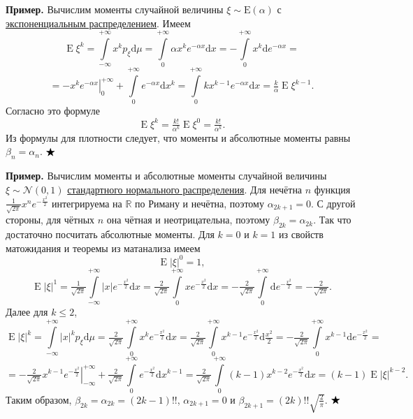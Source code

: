 \documentclass[12pt]{article}
\numberwithin{theorem}{section}
\theoremstyle{definition}
\newenvironment{example}{\indent \textbf{Пример.}}{$ \hfill \bigstar $}
\newcommand{\RR}{\mathbb{R}}
\newcommand{\expect}{\operatorname{E}}
\newcommand{\diff}{\mathrm{d}}
\begin{document}
	\begin{example}
		Вычислим моменты случайной величины $ \xi \sim \mathrm{E}(\alpha) $ 
		с \hyperlink{exponential-distribution}{экспоненциальным распределением}.
		Имеем
		$$ \expect\xi^k = \int\limits_{-\infty}^{+\infty} x^k p_\xi \diff\mu
		= \int\limits_{0}^{+\infty} \alpha x^k e^{-\alpha x} \diff x
		= -\int\limits_{0}^{+\infty} x^k \diff e^{-\alpha x} = $$ 
		$$ = \left.-x^ke^{-\alpha x}\right|_{0}^{+\infty} 
		+ \int\limits_{0}^{+\infty} e^{-\alpha x}\diff x^k
		= \int\limits_{0}^{+\infty} kx^{k - 1} e^{-\alpha x}\diff x
		= \tfrac{k}{\alpha}\expect\xi^{k - 1}. $$
		Согласно это формуле
		$$ \expect\xi^k = \tfrac{k!}{\alpha^k} \expect\xi^0 = \tfrac{k!}{\alpha^k}. $$
		Из формулы для плотности следует, что моменты и абсолютные моменты равны $ \beta_n = \alpha_n $.
	\end{example}
	
	\begin{example}
		Вычислим моменты и абсолютные моменты случайной величины $ \xi \sim \mathcal{N}(0, 1) $ 
		\hyperlink{standard-normal-distribution}{стандартного нормального распределения}.
		Для нечётна $ n $ функция $ \tfrac{1}{\sqrt{2\pi}} x^n e^{-\tfrac{x^2}{2}} $
		интегрируема на $ \RR $ по Риману и нечётна, поэтому
		$ \alpha_{2k + 1} = 0 $.
		С другой стороны, для чётных $ n $ она чётная и неотрицательна, поэтому $ \beta_{2k} = \alpha_{2k} $.
		Так что достаточно посчитать абсолютные моменты.
		Для $ k = 0 $ и $ k = 1 $ из свойств матожидания и теоремы из матанализа имеем
		$$ \expect|\xi|^0 = 1, $$ 
		$$ \expect|\xi|^1 = \tfrac{1}{\sqrt{2\pi}} \int\limits_{-\infty}^{+\infty} |x|e^{-\tfrac{x^2}{2}} \diff x 
		= \tfrac{2}{\sqrt{2\pi}} \int\limits_{0}^{+\infty} xe^{-\tfrac{x^2}{2}} \diff x
		= -\tfrac{2}{\sqrt{2\pi}} \int\limits_{0}^{+\infty} \diff e^{-\tfrac{x^2}{2}}
		= -\tfrac{2}{\sqrt{2\pi}}. $$
		Далее для $ k \leqslant 2 $,
		$$ \expect|\xi|^k = \int\limits_{-\infty}^{+\infty} |x|^k p_\xi \diff\mu
		= \tfrac{2}{\sqrt{2\pi}} \int\limits_{0}^{+\infty} x^k e^{-\tfrac{x^2}{2}} \diff x
		= \tfrac{2}{\sqrt{2\pi}} \int\limits_{0}^{+\infty} x^{k - 1} e^{-\tfrac{x^2}{2}} \diff \tfrac{x^2}{2}
		= - \tfrac{2}{\sqrt{2\pi}} \int\limits_{0}^{+\infty} x^{k - 1} \diff e^{-\tfrac{x^2}{2}} = $$
		$$ = \left.-\tfrac{2}{\sqrt{2\pi}}x^{k - 1}e^{-\tfrac{x^2}{2}}\right|_{-\infty}^{+\infty}
		+ \tfrac{2}{\sqrt{2\pi}} \int\limits_{0}^{+\infty} e^{-\tfrac{x^2}{2}} \diff x^{k - 1}
		= \tfrac{2}{\sqrt{2\pi}} \int\limits_{0}^{+\infty} (k - 1)x^{k - 2} e^{-\tfrac{x^2}{2}} \diff x
		= (k - 1)\expect|\xi|^{k - 2}. $$
		Таким образом, $ \beta_{2k} = \alpha_{2k} = (2k - 1)!! $, $ \alpha_{2k + 1} = 0 $
		и $ \beta_{2k + 1} = (2k)!! \sqrt{\tfrac{2}{\pi}} $. 
	\end{example}
	
\end{document}
